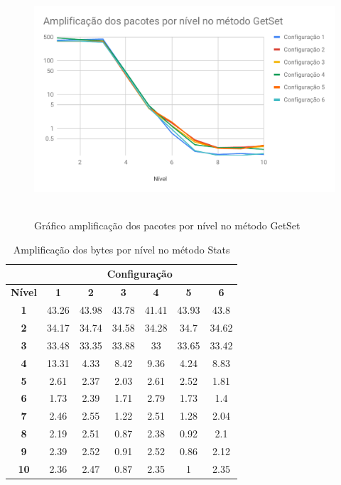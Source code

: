\begin{figure}[H]
     \centering
     \includegraphics[scale=0.7]{img/AmppacGetSet.pdf}\
     \caption{Gráfico amplificação dos pacotes por nível no método GetSet}
\end{figure}

\begin{table}[H]
\centering
\caption{Amplificação dos bytes por nível no método Stats}
\label{tab:AmpBytesStats}
\begin{tabular}{|c|c|c|c|c|c|c|}
\hline
               & \multicolumn{6}{c|}{\textbf{Configuração}}                                  \\ \hline
\textbf{Nível} & \textbf{1} & \textbf{2} & \textbf{3} & \textbf{4} & \textbf{5} & \textbf{6} \\ \hline
\textbf{1}     & 43.26      & 43.98      & 43.78      & 41.41      & 43.93      & 43.8       \\ \hline
\textbf{2}     & 34.17      & 34.74      & 34.58      & 34.28      & 34.7       & 34.62      \\ \hline
\textbf{3}     & 33.48      & 33.35      & 33.88      & 33         & 33.65      & 33.42      \\ \hline
\textbf{4}     & 13.31      & 4.33       & 8.42       & 9.36       & 4.24       & 8.83       \\ \hline
\textbf{5}     & 2.61       & 2.37       & 2.03       & 2.61       & 2.52       & 1.81       \\ \hline
\textbf{6}     & 1.73       & 2.39       & 1.71       & 2.79       & 1.73       & 1.4        \\ \hline
\textbf{7}     & 2.46       & 2.55       & 1.22       & 2.51       & 1.28       & 2.04       \\ \hline
\textbf{8}     & 2.19       & 2.51       & 0.87       & 2.38       & 0.92       & 2.1        \\ \hline
\textbf{9}     & 2.39       & 2.52       & 0.91       & 2.52       & 0.86       & 2.12       \\ \hline
\textbf{10}    & 2.36       & 2.47       & 0.87       & 2.35       & 1          & 2.35       \\ \hline
\end{tabular}
\end{table}

